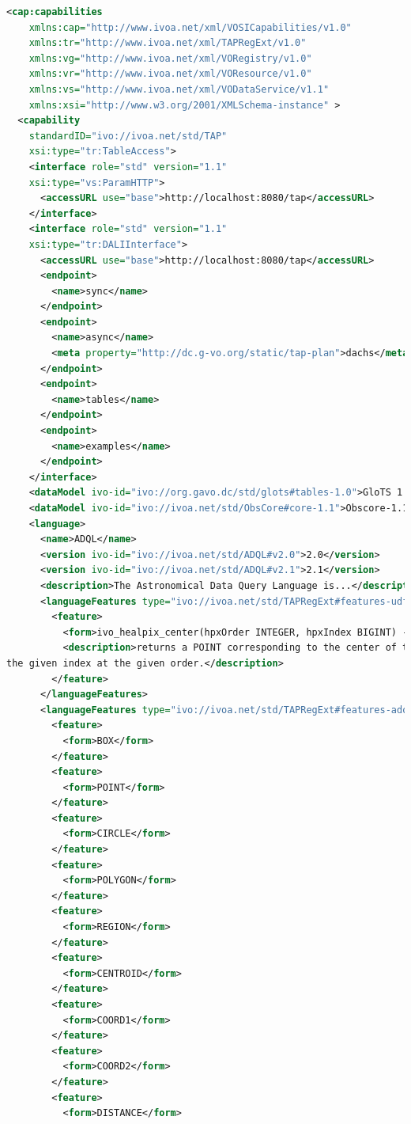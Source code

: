 \documentclass{ivoa}
\begin{document}
\begin{lstlisting}[basicstyle=\footnotesize,language=XML]
<cap:capabilities 
	xmlns:cap="http://www.ivoa.net/xml/VOSICapabilities/v1.0" 
	xmlns:tr="http://www.ivoa.net/xml/TAPRegExt/v1.0" 
	xmlns:vg="http://www.ivoa.net/xml/VORegistry/v1.0" 
	xmlns:vr="http://www.ivoa.net/xml/VOResource/v1.0" 
	xmlns:vs="http://www.ivoa.net/xml/VODataService/v1.1" 
	xmlns:xsi="http://www.w3.org/2001/XMLSchema-instance" >
  <capability 
	standardID="ivo://ivoa.net/std/TAP" 
	xsi:type="tr:TableAccess">
    <interface role="std" version="1.1" 
	xsi:type="vs:ParamHTTP">
      <accessURL use="base">http://localhost:8080/tap</accessURL>
    </interface>
    <interface role="std" version="1.1" 
	xsi:type="tr:DALIInterface">
      <accessURL use="base">http://localhost:8080/tap</accessURL>
      <endpoint>
        <name>sync</name>
      </endpoint>
      <endpoint>
        <name>async</name>
        <meta property="http://dc.g-vo.org/static/tap-plan">dachs</meta>
      </endpoint>
      <endpoint>
        <name>tables</name>
      </endpoint>
      <endpoint>
        <name>examples</name>
      </endpoint>
    </interface>
    <dataModel ivo-id="ivo://org.gavo.dc/std/glots#tables-1.0">GloTS 1.0</dataModel>
    <dataModel ivo-id="ivo://ivoa.net/std/ObsCore#core-1.1">Obscore-1.1</dataModel>
    <language>
      <name>ADQL</name>
      <version ivo-id="ivo://ivoa.net/std/ADQL#v2.0">2.0</version>
      <version ivo-id="ivo://ivoa.net/std/ADQL#v2.1">2.1</version>
      <description>The Astronomical Data Query Language is...</description>
      <languageFeatures type="ivo://ivoa.net/std/TAPRegExt#features-udf">
        <feature>
          <form>ivo_healpix_center(hpxOrder INTEGER, hpxIndex BIGINT) -&gt; POINT</form>
          <description>returns a POINT corresponding to the center of the healpix with
the given index at the given order.</description>
        </feature>
      </languageFeatures>
      <languageFeatures type="ivo://ivoa.net/std/TAPRegExt#features-adqlgeo">
        <feature>
          <form>BOX</form>
        </feature>
        <feature>
          <form>POINT</form>
        </feature>
        <feature>
          <form>CIRCLE</form>
        </feature>
        <feature>
          <form>POLYGON</form>
        </feature>
        <feature>
          <form>REGION</form>
        </feature>
        <feature>
          <form>CENTROID</form>
        </feature>
        <feature>
          <form>COORD1</form>
        </feature>
        <feature>
          <form>COORD2</form>
        </feature>
        <feature>
          <form>DISTANCE</form>

\end{lstlisting}
\end{document}
